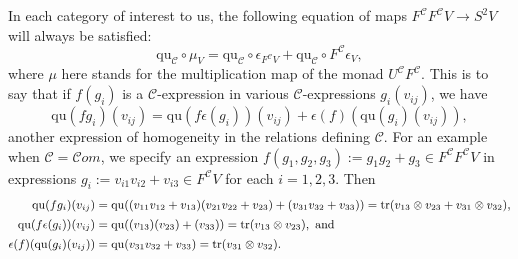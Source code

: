 \documentclass[11pt]{amsart} \renewcommand{\baselinestretch}{1.2}
\theoremstyle{plain}
\theoremstyle{definition}
\DeclareMathOperator{\trace}{tr}
\renewcommand{\to}{\longrightarrow}
\newcommand{\scrC}{\mathscr{C}}
\newcommand{\calc}{\mathcal{C}}
\newcommand{\quadratic}{\mathrm{qu}}
\newcommand{\algs}{{\scrC\!\textit{om}}}
\begin{document}
\begin{Pi-algebras and cohomology algebras}
In each category of interest to us, the following equation of maps $F^\calc F^\calc V\to S^2 V$ will always be satisfied:
\[\quadratic_\calc\circ\mu_V=\quadratic_\calc\circ \epsilon_{F^\calc V} +\quadratic_\calc\circ {F^\calc \epsilon_V},\]
where $\mu$ here stands for the multiplication map of the monad $U^\calc F^\calc $. This is to say that if  $f(g_i)$ is a $\calc$-expression in various $\calc$-expressions $g_i(v_{ij})$, we have 
\[\quadratic(fg_i)(v_{ij})=\quadratic(f\epsilon(g_i))(v_{ij})+\epsilon(f)(\quadratic(g_i)(v_{ij})),\]
another expression of homogeneity in the relations defining $\calc$. For an example when $\calc=\algs$, we specify an expression $f(g_1,g_2,g_3):=g_1g_2+g_3\in F^\calc F^\calc V$ in expressions $g_i:=v_{i1}v_{i2}+v_{i3}\in F^\calc V$ for each $i=1,2,3$. Then
\begin{alignat*}{2}
\textup{\small$\quadratic(fg_i)(v_{ij})={}$}
&
\textup{\small$\quadratic((v_{11}v_{12}+v_{13})(v_{21}v_{22}+v_{23})+(v_{31}v_{32}+v_{33}))=\trace(v_{13}\otimes v_{23}+v_{31}\otimes v_{32}),$}
\\
\textup{\small$\quadratic(f\epsilon(g_i))(v_{ij})={}$}
&
\textup{\small$\quadratic((v_{13})(v_{23})+(v_{33}))=\trace(v_{13}\otimes v_{23}),\textup{ and}$}
\\
\textup{\small$\epsilon(f)(\quadratic(g_i)(v_{ij}))={}$}
&
\textup{\small$\quadratic(v_{31}v_{32}+v_{33})=\trace(v_{31}\otimes v_{32}).$}
\end{alignat*}










\end{Pi-algebras and cohomology algebras}
\end{document}
